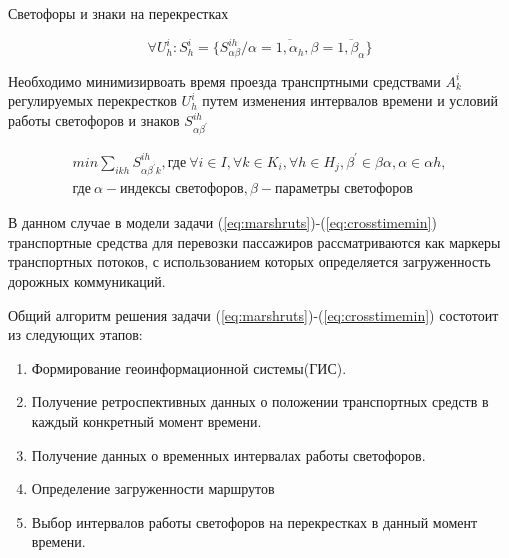 \documentclass[a4paper,13pt]{article}
\begin{document}
Светофоры и знаки на перекрестках

\begin{equation}\label{eq:crosstime}
\forall U_h^{i} :S^i_{h} = \{ S^{ih}_{\alpha \beta}/\alpha = \overline{1,{\alpha}_h} , \beta = \overline{1,{\beta}_{\alpha}} \}
\end{equation}

Необходимо минимизирвоать время проезда транспртными средствами \begin{math}A^{i}_k\end{math} регулируемых перекрестков \begin{math}U^i_{h}\end{math} путем изменения интервалов времени и условий работы светофоров и знаков \begin{math}S^{ih}_{\alpha \beta^{\prime}}\end{math}

\begin{equation}\label{eq:crosstimemin}
\begin{split}
min \sum_{ikh} S^{ih}_{\alpha \beta^{\prime} k}, \text{где}\ \forall i \in I, \forall k \in K_i, \forall h \in H_j, \beta^{\prime} \in \beta \alpha , \alpha \in \alpha h , \\ \text{где}\ \alpha - \text{индексы светофоров}, \beta - \text{параметры светофоров}
\end{split}
\end{equation} 

В данном случае в модели задачи (\ref{eq:marshruts})-(\ref{eq:crosstimemin}) транспортные средства для перевозки пассажиров рассматриваются как маркеры транспортных потоков, с использованием которых определяется загруженность дорожных коммуникаций.

Общий алгоритм решения задачи (\ref{eq:marshruts})-(\ref{eq:crosstimemin}) состотоит из следующих этапов:
\begin{enumerate}
\item Формирование геоинформационной системы(ГИС).
\item Получение ретроспективных данных о положении транспортных средств в каждый конкретный момент времени.
\item Получение данных о временных интервалах работы светофоров.
\item Определение загруженности маршрутов
\item Выбор интервалов работы светофоров на перекрестках в данный момент времени.
\end{enumerate}
\end{document}
